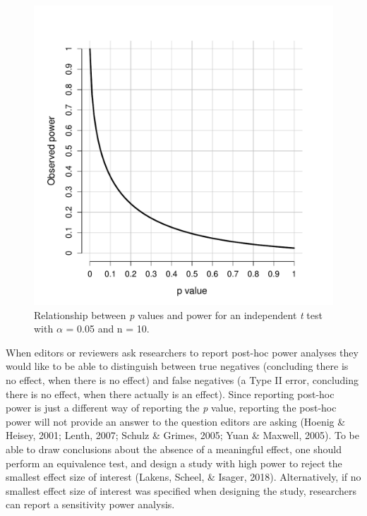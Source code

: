 \documentclass[
  english,
  ,jou,floatsintext]{apa6}
\begin{document}
\begin{figure}
\centering
\includegraphics{sample_size_justification_files/figure-latex/obs-power-plot-2-1.pdf}
\caption{\label{fig:obs-power-plot-2}Relationship between \emph{p} values and power for an independent \emph{t} test with \(\alpha\) = 0.05 and n = 10.}
\end{figure}

When editors or reviewers ask researchers to report post-hoc power analyses they would like to be able to distinguish between true negatives (concluding there is no effect, when there is no effect) and false negatives (a Type II error, concluding there is no effect, when there actually is an effect). Since reporting post-hoc power is just a different way of reporting the \emph{p} value, reporting the post-hoc power will not provide an answer to the question editors are asking (Hoenig \& Heisey, 2001; Lenth, 2007; Schulz \& Grimes, 2005; Yuan \& Maxwell, 2005). To be able to draw conclusions about the absence of a meaningful effect, one should perform an equivalence test, and design a study with high power to reject the smallest effect size of interest (Lakens, Scheel, \& Isager, 2018). Alternatively, if no smallest effect size of interest was specified when designing the study, researchers can report a sensitivity power analysis.
\end{document}
